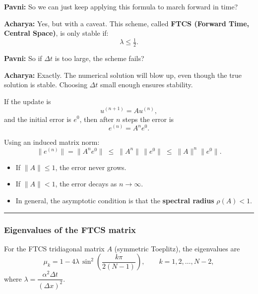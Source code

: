 \documentclass[
  letterpaper,
]{book}
\providecommand{\tightlist}{%
  \setlength{\itemsep}{0pt}\setlength{\parskip}{0pt}}
\begin{document}
\textbf{Pavni:} So we can just keep applying this formula to march
forward in time?

\textbf{Acharya:} Yes, but with a caveat. This scheme, called
\textbf{FTCS (Forward Time, Central Space)}, is only stable if: \[
\lambda \leq \tfrac{1}{2}.
\]

\textbf{Pavni:} So if \(\Delta t\) is too large, the scheme fails?

\textbf{Acharya:} Exactly. The numerical solution will blow up, even
though the true solution is stable. Choosing \(\Delta t\) small enough
ensures stability.

\begin{tcolorbox}[enhanced jigsaw, toprule=.15mm, opacityback=0, rightrule=.15mm, breakable, colframe=quarto-callout-note-color-frame, coltitle=black, toptitle=1mm, titlerule=0mm, left=2mm, bottomrule=.15mm, leftrule=.75mm, colback=white, colbacktitle=quarto-callout-note-color!10!white, bottomtitle=1mm, opacitybacktitle=0.6, title=\textcolor{quarto-callout-note-color}{\faInfo}\hspace{0.5em}{Why the FTCS stability condition is \(\lambda \leq \tfrac{1}{2}\)}, arc=.35mm]

If the update is \[
u^{(n+1)} = A u^{(n)},
\] and the initial error is \(e^0\), then after \(n\) steps the error is
\[
e^{(n)} = A^n e^0.
\]

Using an induced matrix norm: \[
\|e^{(n)}\| = \|A^n e^0\| \;\le\; \|A^n\|\,\|e^0\|
\;\le\; \|A\|^n \|e^0\|.
\]

\begin{itemize}
\tightlist
\item
  If \(\|A\|\le 1\), the error never grows.\\
\item
  If \(\|A\|<1\), the error decays as \(n\to\infty\).\\
\item
  In general, the asymptotic condition is that the \textbf{spectral
  radius} \(\rho(A)<1\).
\end{itemize}

\begin{center}\rule{0.5\linewidth}{0.5pt}\end{center}

\subsubsection{Eigenvalues of the FTCS
matrix}\label{eigenvalues-of-the-ftcs-matrix}

For the FTCS tridiagonal matrix \(A\) (symmetric Toeplitz), the
eigenvalues are \[
\mu_k = 1 - 4 \lambda \,\sin^2\!\left(\frac{k\pi}{2(N-1)}\right), 
\qquad k=1,2,\dots,N-2,
\] where \(\lambda = \dfrac{\alpha^2 \Delta t}{(\Delta x)^2}\).


\end{tcolorbox}
\end{document}
